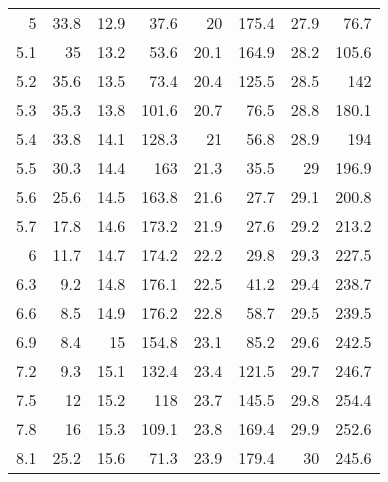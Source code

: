 \documentclass[a4 paper,12pt]{article}
\begin{document}
\begin{center}
\begin{longtable}{||r|r||r|r||r|r||r|r||}
		5     & 33.8  & 12.9  & 37.6  & 20    & 175.4 & 27.9  & 76.7 \\
		5.1   & 35    & 13.2  & 53.6  & 20.1  & 164.9 & 28.2  & 105.6 \\
		\hline
		\hline
		5.2   & 35.6  & 13.5  & 73.4  & 20.4  & 125.5 & 28.5  & 142 \\
		5.3   & 35.3  & 13.8  & 101.6 & 20.7  & 76.5  & 28.8  & 180.1 \\
		5.4   & 33.8  & 14.1  & 128.3 & 21    & 56.8  & 28.9  & 194 \\
		5.5   & 30.3  & 14.4  & 163   & 21.3  & 35.5  & 29    & 196.9 \\
		5.6   & 25.6  & 14.5  & 163.8 & 21.6  & 27.7  & 29.1  & 200.8 \\
		5.7   & 17.8  & 14.6  & 173.2 & 21.9  & 27.6  & 29.2  & 213.2 \\
		6     & 11.7  & 14.7  & 174.2 & 22.2  & 29.8  & 29.3  & 227.5 \\
		6.3   & 9.2   & 14.8  & 176.1 & 22.5  & 41.2  & 29.4  & 238.7 \\
		6.6   & 8.5   & 14.9  & 176.2 & 22.8  & 58.7  & 29.5  & 239.5 \\
		6.9   & 8.4   & 15    & 154.8 & 23.1  & 85.2  & 29.6  & 242.5 \\
		7.2   & 9.3   & 15.1  & 132.4 & 23.4  & 121.5 & 29.7  & 246.7 \\
		7.5   & 12    & 15.2  & 118   & 23.7  & 145.5 & 29.8  & 254.4 \\
		7.8   & 16    & 15.3  & 109.1 & 23.8  & 169.4 & 29.9  & 252.6 \\
		8.1   & 25.2  & 15.6  & 71.3  & 23.9  & 179.4 & 30    & 245.6 \\
		\hline
\end{longtable}
\end{center}
\end{document}
